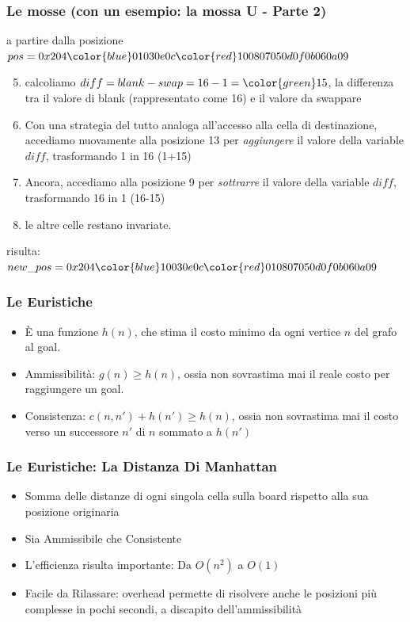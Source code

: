\documentclass[11pt]{beamer}
\begin{document}
\begin{frame}
    \frametitle{Le mosse (con un esempio: la mossa U - Parte 2)}
    a partire dalla posizione $pos = 0x204{\color{blue}01}030e0c{\color{red}10}0807050d0f0b060a09$
    \begin{enumerate}
        \setcounter{enumi}{4}
    \item calcoliamo $diff  = blank - swap = 16 - 1 = {\color{green}15}$, la differenza tra il valore di blank (rappresentato come 16) e il valore da swappare
    \item Con una strategia del tutto analoga all'accesso alla cella di destinazione, accediamo nuovamente alla posizione {\color{blue}13} per \emph{aggiungere} il valore della variable $diff$, trasformando 1 in 16 (1+15)
    \item Ancora, accediamo alla posizione {\color{blue}9} per \emph{sottrarre} il valore della variable $diff$, trasformando 16 in 1 (16-15)
    \item le altre celle restano invariate.
    \end{enumerate}
    risulta: $new\_pos = 0x204{\color{blue}10}030e0c{\color{red}01}0807050d0f0b060a09$
\end{frame}


\begin{frame}
\frametitle{Le Euristiche}
\begin{itemize}
    \item È una funzione $h(n)$, che stima il costo minimo da ogni vertice $n$ del grafo al goal.
    \item Ammissibilità: $g(n) \geq h(n)$, ossia non sovrastima mai il reale costo per raggiungere un goal.
    \item Consistenza: $c(n, n') + h(n') \geq h(n)$, ossia non sovrastima mai il costo verso un successore $n'$ di $n$ sommato a $h(n')$  
\end{itemize}
\centering
\end{frame}

\begin{frame}
\frametitle{Le Euristiche: La Distanza Di Manhattan}
\begin{itemize}
    \item Somma delle distanze di ogni singola cella sulla board rispetto alla sua posizione originaria 
    \item Sia Ammissibile che Consistente
    \item L'efficienza risulta importante: Da $O(n^2)$ a $O(1)$
    \item Facile da Rilassare: overhead permette di risolvere anche le posizioni più complesse in pochi secondi, a discapito dell'ammissibilità
\end{itemize}
\centering
\end{frame}
\end{document}
